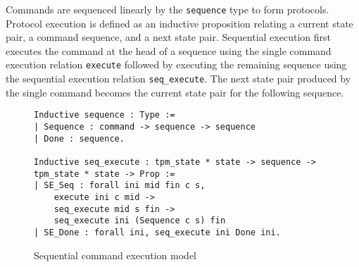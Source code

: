 \documentclass[runningheads]{llncs}
\begin{document}



Commands are sequenced linearly by the \verb|sequence| type to form
protocols. Protocol execution is defined as an inductive proposition
relating a current state pair, a command sequence, and a next state
pair. Sequential execution first executes the command at the head of a
sequence using the single command execution relation \verb|execute|
followed by executing the remaining sequence using the sequential
execution relation \verb|seq_execute|. The next state pair produced by
the single command becomes the current state pair for the following
sequence.

\begin{figure}[hbtp]
\begin{lstlisting}[language=Coq]
Inductive sequence : Type :=
| Sequence : command -> sequence -> sequence
| Done : sequence.

Inductive seq_execute : tpm_state * state -> sequence -> tpm_state * state -> Prop :=
| SE_Seq : forall ini mid fin c s,
    execute ini c mid ->
    seq_execute mid s fin ->
    seq_execute ini (Sequence c s) fin
| SE_Done : forall ini, seq_execute ini Done ini.
\end{lstlisting}
\caption{Sequential command execution model}
\label{fig:command-sequence-model}
\end{figure}
\end{document}
